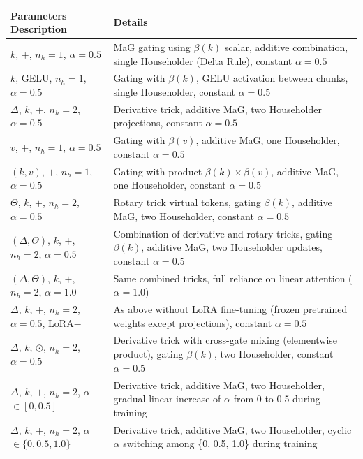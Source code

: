 \documentclass[10pt,a4paper]{article}
\begin{document}
\begin{table}[ht]
\centering
\renewcommand{\arraystretch}{1.3}
\begin{tabular}{|l|p{11cm}|}
\hline
\textbf{Parameters Description} & \textbf{Details} \\
\hline
$k$, $+$, $n_h=1$, $\alpha=0.5$ & MaG gating using \(\beta(k)\) scalar, additive combination, single Householder (Delta Rule), constant \(\alpha=0.5\) \\
$k$, GELU, $n_h=1$, $\alpha=0.5$ & Gating with \(\beta(k)\), GELU activation between chunks, single Householder, constant \(\alpha=0.5\) \\
$\Delta$, $k$, $+$, $n_h=2$, $\alpha=0.5$ & Derivative trick, additive MaG, two Householder projections, constant \(\alpha=0.5\) \\
$v$, $+$, $n_h=1$, $\alpha=0.5$ & Gating with \(\beta(v)\), additive MaG, one Householder, constant \(\alpha=0.5\) \\
$(k,v)$, $+$, $n_h=1$, $\alpha=0.5$ & Gating with product \(\beta(k) \times \beta(v)\), additive MaG, one Householder, constant \(\alpha=0.5\) \\
$\Theta$, $k$, $+$, $n_h=2$, $\alpha=0.5$ & Rotary trick virtual tokens, gating \(\beta(k)\), additive MaG, two Householder, constant \(\alpha=0.5\) \\
$(\Delta,\Theta)$, $k$, $+$, $n_h=2$, $\alpha=0.5$ & Combination of derivative and rotary tricks, gating \(\beta(k)\), additive MaG, two Householder updates, constant \(\alpha=0.5\) \\
$(\Delta,\Theta)$, $k$, $+$, $n_h=2$, $\alpha=1.0$ & Same combined tricks, full reliance on linear attention (\(\alpha=1.0\)) \\
$\Delta$, $k$, $+$, $n_h=2$, $\alpha=0.5$, LoRA$-$ & As above without LoRA fine-tuning (frozen pretrained weights except projections), constant \(\alpha=0.5\) \\
$\Delta$, $k$, $\odot$, $n_h=2$, $\alpha=0.5$ & Derivative trick with cross-gate mixing (elementwise product), gating \(\beta(k)\), two Householder, constant \(\alpha=0.5\) \\
$\Delta$, $k$, $+$, $n_h=2$, $\alpha$ $\in [0,0.5]$ & Derivative trick, additive MaG, two Householder, gradual linear increase of \(\alpha\) from 0 to 0.5 during training \\
$\Delta$, $k$, $+$, $n_h=2$, $\alpha$ $\in \{0, 0.5, 1.0\}$ & Derivative trick, additive MaG, two Householder, cyclic \(\alpha\) switching among \{0, 0.5, 1.0\} during training \\

\end{tabular}
\end{table}
\end{document}
